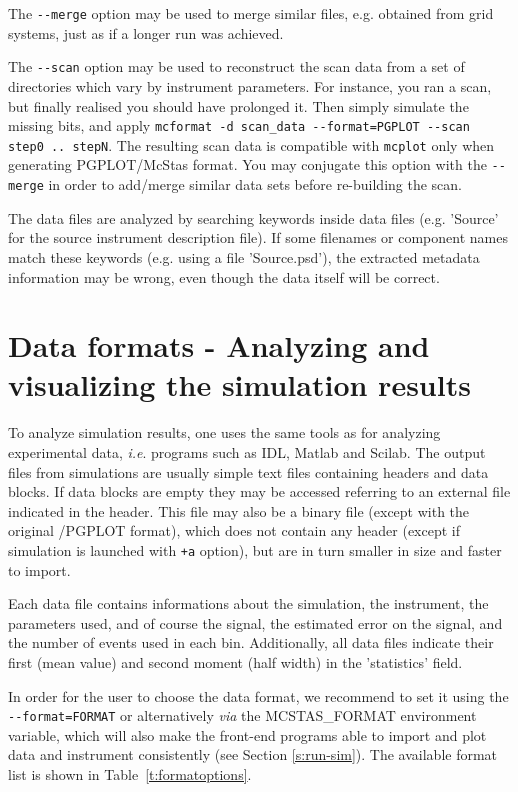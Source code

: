 The \verb+--merge+ option may be used to merge similar files, e.g. obtained from
grid systems, just as if a longer run was achieved.

The \verb+--scan+ option may be used to reconstruct the scan data from a set of
directories which vary by instrument parameters. For instance, you ran a scan,
but finally realised you should have prolonged it. Then simply simulate the
missing bits, and apply
\verb+mcformat -d scan_data --format=PGPLOT --scan step0 .. stepN+. The
resulting scan data is compatible with \verb+mcplot+ only when generating
PGPLOT/McStas format. You may conjugate this option with the
\verb+--merge+ in order to add/merge similar data sets before re-building the
scan.

The data files are analyzed by searching keywords inside data files
(e.g. 'Source' for the source instrument description file). If some filenames or
component names match these keywords (e.g. using a file 'Source.psd'), the
extracted metadata information may be wrong, even though the data itself will be
correct.

\section{Data formats - Analyzing and visualizing the simulation results}
\label{s:analyze}

To analyze simulation results, one uses the same tools as for analyzing
experimental data, \textit{i.e}. programs such as IDL, Matlab and Scilab.  The
output files from simulations are usually simple text files containing headers
and data blocks. If data blocks are empty they may be accessed referring to an
external file indicated in the header. This file may also be a binary file
(except with the original \MCS /PGPLOT format), which does not contain any
header (except if simulation is launched with \verb|+a| option), but are in turn
smaller in size and faster to import.

Each data file contains informations about the simulation, the instrument, the
parameters used, and of course the signal, the estimated error on the signal,
and the number of events used in each bin. Additionally, all data files indicate
their first (mean value) and second moment (half width) in the 'statistics'
field.

In order for the user to choose the data format, we recommend to set it using
the \verb+--format=FORMAT+ or alternatively {\it via} the MCSTAS\_FORMAT
environment variable, which will also make the front-end programs able to import
and plot data and instrument consistently (see Section \ref{s:run-sim}). The
available format list is shown in
Table~\ref{t:formatoptions}. 

